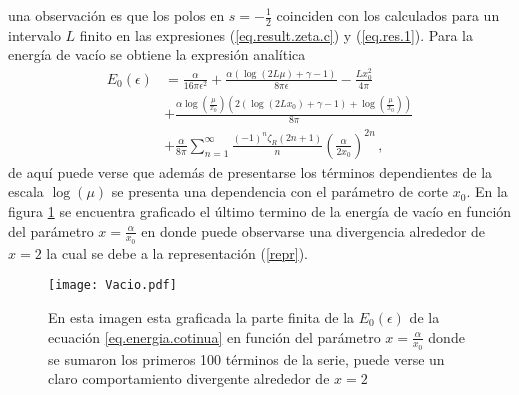 una observación es que los polos en $s = -\frac{1}{2}$ coinciden con los calculados para un intervalo $L$ finito en las expresiones (\ref{eq.result.zeta.c}) y (\ref{eq.res.1}).
Para la energía de vacío se obtiene la expresión analítica
\begin{align}
\label{eq.energia.cotinua}
	E _0 ( \epsilon ) 
&	
	=
\nonumber
	\frac{\alpha}{16 \pi  \epsilon  ^2} +
	\frac{\alpha \left( \log (2 L \mu ) + \gamma -1  \right)}{8 \pi \epsilon } -
	\frac{L x _0 ^2}{4 \pi}
\\
\nonumber
&
+
	\frac{\alpha \log \left( \frac{\mu}{x _0} \right) 	
		\left( 2 (\log ( 2 L x_0) + \gamma -1 ) + \log \left( \frac{\mu}{x _0}\right)  \right) }{8 \pi}
\\
&
+	
	\frac{\alpha }{8 \pi} 
	\sum _{n=1} ^{\infty} \frac{(-1) ^{n} \zeta _R (2n+1) }{n}  
	\left( \frac{\alpha}{2 x _0} \right) ^{2n}
\, ,
\end{align}
de aquí puede verse que además de presentarse los términos dependientes de la escala $\log ( \mu )$ se presenta una dependencia con el parámetro de corte $x _0$.
En la figura \ref{fig:vacio} se encuentra graficado el último termino de la energía de vacío en función del parámetro $x = \frac{\alpha}{x_0}$ en donde puede observarse una divergencia alrededor de $x=2$ la cual se debe a la representación (\ref{repr}).

\begin{figure}
    \centering
    \texttt{[image: Vacio.pdf]}
    \caption{En esta imagen esta graficada la parte finita de la $E _0 (\epsilon) $ de la ecuación \ref{eq.energia.cotinua} en función del parámetro $x= \frac{\alpha}{x _0}$ donde se sumaron los primeros 100 términos de la serie, puede verse un claro comportamiento divergente alrededor de $x=2$}
    \label{fig:vacio}
\end{figure}



